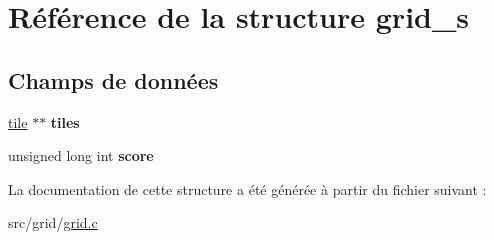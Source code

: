 \hypertarget{structgrid__s}{
\section{Référence de la structure grid\_\-s}
\label{structgrid__s}
}
\subsection*{Champs de données}
\begin{DoxyCompactItemize}
\item 
\hypertarget{structgrid__s_a9edca85e2c4d7cf999df0ba2207200f0}{
\hyperlink{grid_8h_a9a1fe03e260de47d12663efab5b0eec0}{tile} $\ast$$\ast$ {\bfseries tiles}}
\label{structgrid__s_a9edca85e2c4d7cf999df0ba2207200f0}

\item 
\hypertarget{structgrid__s_afa23aef9d235eb9bd53c89f1a5179645}{
unsigned long int {\bfseries score}}
\label{structgrid__s_afa23aef9d235eb9bd53c89f1a5179645}

\end{DoxyCompactItemize}


La documentation de cette structure a été générée à partir du fichier suivant :\begin{DoxyCompactItemize}
\item 
src/grid/\hyperlink{grid_8c}{grid.c}\end{DoxyCompactItemize}

